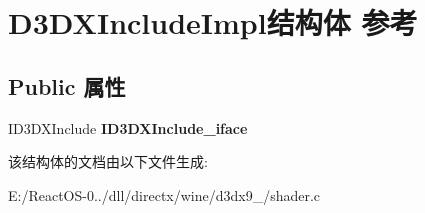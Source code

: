 \hypertarget{struct_d3_d_x_include_impl}{}\section{D3\+D\+X\+Include\+Impl结构体 参考}
\label{struct_d3_d_x_include_impl}
\subsection*{Public 属性}
\begin{DoxyCompactItemize}
\item 
\mbox{\label{struct_d3_d_x_include_impl_a450f6a64dc7093dce9f633c2199112b1}} 
I\+D3\+D\+X\+Include {\bfseries I\+D3\+D\+X\+Include\+\_\+iface}
\end{DoxyCompactItemize}


该结构体的文档由以下文件生成\+:\begin{DoxyCompactItemize}
\item 
E\+:/\+React\+O\+S-\/0../dll/directx/wine/d3dx9\+\_/shader.\+c\end{DoxyCompactItemize}
